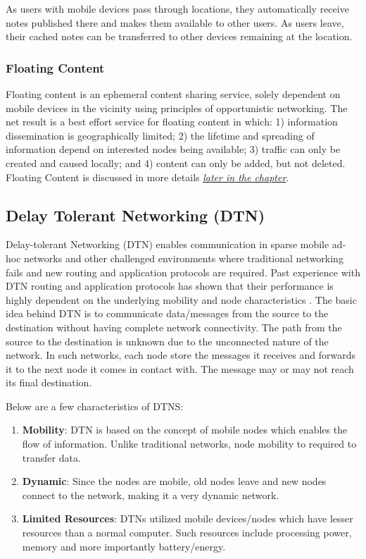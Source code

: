 As users with mobile devices pass through locations, they automatically receive notes published there and makes them available to other users. As users leave, their cached notes can be transferred to other devices remaining at the location.


\subsubsection{Floating Content \cite{floating-content}}
Floating content is an ephemeral content sharing service, solely dependent on mobile devices in the vicinity using principles of opportunistic networking. The net result is a best effort service for floating content in which: 1) information dissemination is geographically limited; 2) the lifetime and spreading of information depend on interested nodes being available; 3) traffic can only be created and caused locally; and 4) content can only be added, but not deleted. Floating Content is discussed in more details \hyperref[section:floating-content]{\emph{later in the chapter}}.

\subsection{Delay Tolerant Networking (DTN)}
Delay-tolerant Networking (DTN) enables communication in sparse mobile ad-hoc networks and other challenged environments where traditional networking fails and new routing and application protocols are required. Past experience with DTN routing and application protocols has shown that their performance is highly dependent on the underlying mobility and node characteristics \cite{keranen-theone}. The basic idea behind DTN is to communicate data/messages from the source to the destination without having complete network connectivity. The path from the source to the destination is unknown due to the unconnected nature of the network. In such networks, each node store the messages it receives and forwards it to the next node it comes in contact with. The message may or may not reach its final destination.

Below are a few characteristics of DTNS:
\begin{enumerate}
  \item \textbf{Mobility}: DTN is based on the concept of mobile nodes which enables the flow of information. Unlike traditional networks, node mobility to required to transfer data.
  \item \textbf{Dynamic}: Since the nodes are mobile, old nodes leave and new nodes connect to the network, making it a very dynamic network.
  \item \textbf{Limited Resources}: DTNs utilized mobile devices/nodes which have lesser resources than a normal computer. Such resources include processing power, memory and more importantly battery/energy.
\end{enumerate}

